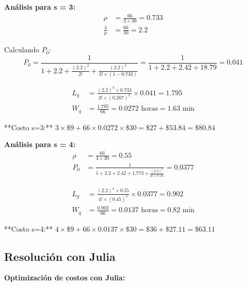 \documentclass[12pt, a4paper, oneside]{book}
\theoremstyle{definition}
\begin{document}
\textbf{Análisis para s = 3:}
\begin{align*}
\rho &= \frac{66}{3 \times 30} = 0.733 \\
\frac{\lambda}{\mu} &= \frac{66}{30} = 2.2
\end{align*}

Calculando $P_0$:
$$P_0 = \frac{1}{1 + 2.2 + \frac{(2.2)^2}{2!} + \frac{(2.2)^3}{3! \times (1-0.733)}} = \frac{1}{1 + 2.2 + 2.42 + 18.79} = 0.041$$

\begin{align*}
L_q &= \frac{(2.2)^3 \times 0.733}{3! \times (0.267)^2} \times 0.041 = 1.795 \\
W_q &= \frac{1.795}{66} = 0.0272 \text{ horas} = 1.63 \text{ min}
\end{align*}

**Costo s=3:** $3 \times \$9 + 66 \times 0.0272 \times \$30 = \$27 + \$53.84 = \$80.84$

\textbf{Análisis para s = 4:}
\begin{align*}
\rho &= \frac{66}{4 \times 30} = 0.55 \\
P_0 &= \frac{1}{1 + 2.2 + 2.42 + 1.773 + \frac{(2.2)^4}{4! \times 0.45}} = 0.0377
\end{align*}

\begin{align*}
L_q &= \frac{(2.2)^4 \times 0.55}{4! \times (0.45)^2} \times 0.0377 = 0.902 \\
W_q &= \frac{0.902}{66} = 0.0137 \text{ horas} = 0.82 \text{ min}
\end{align*}

**Costo s=4:** $4 \times \$9 + 66 \times 0.0137 \times \$30 = \$36 + \$27.11 = \$63.11$

\subsection{Resolución con Julia}

\textbf{Optimización de costos con Julia:}
\end{document}
